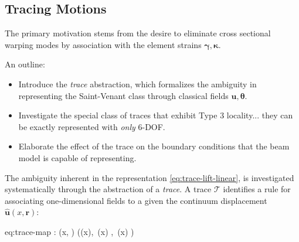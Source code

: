 \subsection{Tracing Motions}\label{sec:trace}

\begin{Quote}
The primary motivation stems from the desire to eliminate cross sectional warping 
modes by association with the element strains \(\bm{\gamma},\bm{\kappa}\). 

An outline:
\begin{itemize}
    \item Introduce the \emph{trace} abstraction, which formalizes the ambiguity in representing the Saint-Venant class through classical fields \(\bm{u},\bm{\theta}\). 
    \item Investigate the special class of traces that exhibit Type 3 locality... they can be exactly represented with \emph{only} 6-DOF.
    \item Elaborate the effect of the trace on the boundary conditions that the beam model is capable of representing. 
\end{itemize}
\end{Quote}



The ambiguity inherent in the representation \eqref{eq:trace-lift-linear}, is investigated systematically through the abstraction of a \emph{trace}. 
A trace $\mathcal{T}$ identifies 
a rule for associating one-dimensional fields to a given the continuum displacement \(\hat{\bm u}(x,\bm{r})\):
\begin{SaveEquation}{eq:trace-map}
: (x, ) \;\longmapsto\; 
\Big((x),\, \bm{\theta}(x)
,\, \bm{\alpha}(x)
\Big)
\end{SaveEquation}

